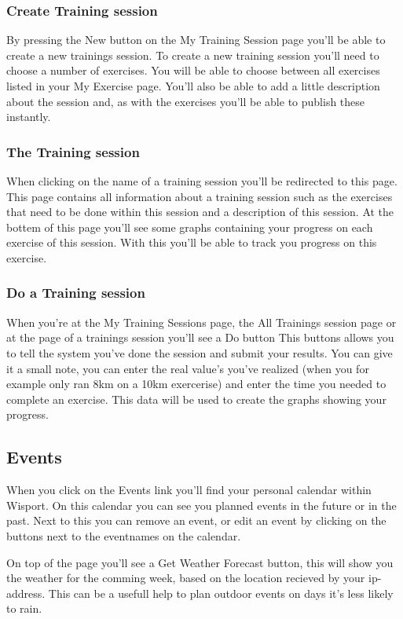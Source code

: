 \documentclass[11pt,a4paper]{scrartcl}
\begin{document}
\subsubsection{Create Training session}
By pressing the New button on the My Training Session page you'll be able to create a new trainings session. To create a new training
session you'll need to choose a number of exercises. You will be able to choose between all exercises listed in your My Exercise page.
You'll also be able to add a little description about the session and, as with the exercises you'll be able to publish these instantly.
\subsubsection{The Training session}
When clicking on the name of a training session you'll be redirected to this page. This page contains all information about a training
session such as the exercises that need to be done within this session and a description of this session. At the bottem of this page
you'll see some graphs containing your progress on each exercise of this session. With this you'll be able to track you progress on this
exercise.
\subsubsection{Do a Training session} 
When you're at the My Training Sessions page, the All Trainings session page or at the page of a trainings session you'll see a Do button
This buttons allows you to tell the system you've done the session and submit your results. You can give it a small note, you can enter
the real value's you've realized (when you for example only ran 8km on a 10km exercerise) and enter the time you needed to complete an 
exercise. This data will be used to create the graphs showing your progress.

\subsection{Events} 
When you click on the Events link you'll find your personal calendar within Wisport. On this calendar you can see you planned events
in the future or in the past. Next to this you can remove an event, or edit an event by clicking on the buttons next to the eventnames
on the calendar.

On top of the page you'll see a Get Weather Forecast button, this will show you the weather for the comming week, based on the location 
recieved by your ip-address. This can be a usefull help to plan outdoor events on days it's less likely to rain.
\end{document}
